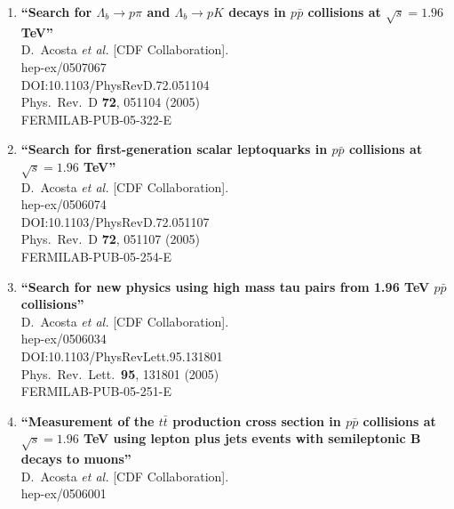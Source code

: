 \documentclass{article}
\begin{document}
\begin{enumerate}
\item%
{\bf ``Search for $\Lambda_b \to p \pi$ and $\Lambda_b \to p K$ decays in $p\bar{p}$ collisions at $\sqrt{s} = 1.96$ TeV''}
  \\{}D.~Acosta {\it et al.} [CDF Collaboration].
  \\{}hep-ex/0507067
  \\{}DOI:10.1103/PhysRevD.72.051104
  \\{}Phys.\ Rev.\ D {\bf 72}, 051104 (2005)
  \\{}FERMILAB-PUB-05-322-E
\item%
{\bf ``Search for first-generation scalar leptoquarks in $p\bar{p}$ collisions at $\sqrt{s} = 1.96$ TeV''}
  \\{}D.~Acosta {\it et al.} [CDF Collaboration].
  \\{}hep-ex/0506074
  \\{}DOI:10.1103/PhysRevD.72.051107
  \\{}Phys.\ Rev.\ D {\bf 72}, 051107 (2005)
  \\{}FERMILAB-PUB-05-254-E
\item%
{\bf ``Search for new physics using high mass tau pairs from 1.96 TeV $p\bar{p}$ collisions''}
  \\{}D.~Acosta {\it et al.} [CDF Collaboration].
  \\{}hep-ex/0506034
  \\{}DOI:10.1103/PhysRevLett.95.131801
  \\{}Phys.\ Rev.\ Lett.\  {\bf 95}, 131801 (2005)
  \\{}FERMILAB-PUB-05-251-E
\item%
{\bf ``Measurement of the $t\bar{t}$ production cross section in $p\bar{p}$ collisions at $\sqrt{s} = 1.96$ TeV using lepton plus jets events with semileptonic B decays to muons''}
  \\{}D.~Acosta {\it et al.} [CDF Collaboration].
  \\{}hep-ex/0506001

\end{enumerate}
\end{document}
